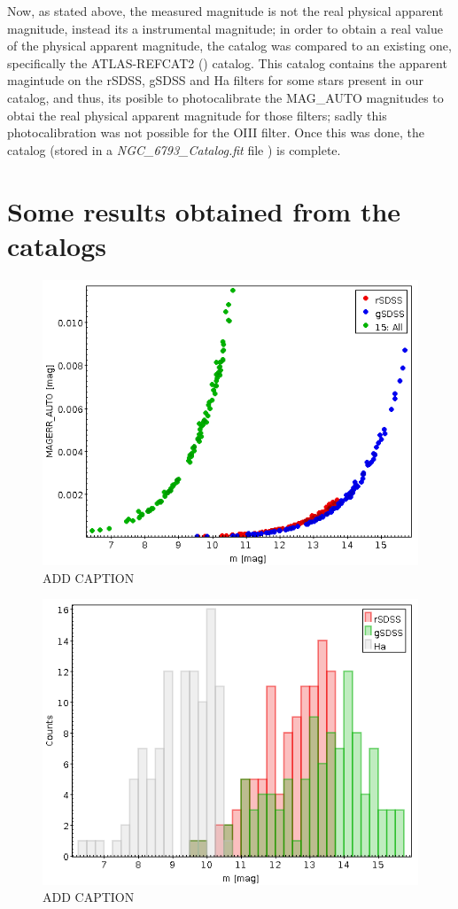 \documentclass{aa}
\begin{document}
    Now, as stated above, the measured magnitude is not the real physical apparent magnitude, instead its a instrumental magnitude; in order to obtain a real value of the physical apparent magnitude, the catalog was compared to an existing one, specifically the ATLAS-REFCAT2 (\cite{PhotoCalibrate}) catalog. This catalog contains the apparent magintude on the rSDSS, gSDSS and Ha filters for some stars present in our catalog, and thus, its posible to photocalibrate the MAG\_AUTO magnitudes to obtai the real physical apparent magnitude for those filters; sadly this photocalibration was not possible for the OIII filter. Once this was done, the catalog (stored in a \textit{NGC\_6793\_Catalog.fit} file \cite{GitHub}) is complete.
    \section{Some results obtained from the catalogs}\label{sec: Results}
    \begin{figure}[H]
        \centering
        \includegraphics[width=0.8\linewidth]{Images/mag_Err.png}
        \caption{ADD CAPTION}
        \label{fig:my_label}
    \end{figure}
    \begin{figure}[H]
        \centering
        \includegraphics[width=0.8\linewidth]{Images/mag_histo.png}
        \caption{ADD CAPTION}
        \label{fig:my_label}
    \end{figure}
\end{document}
